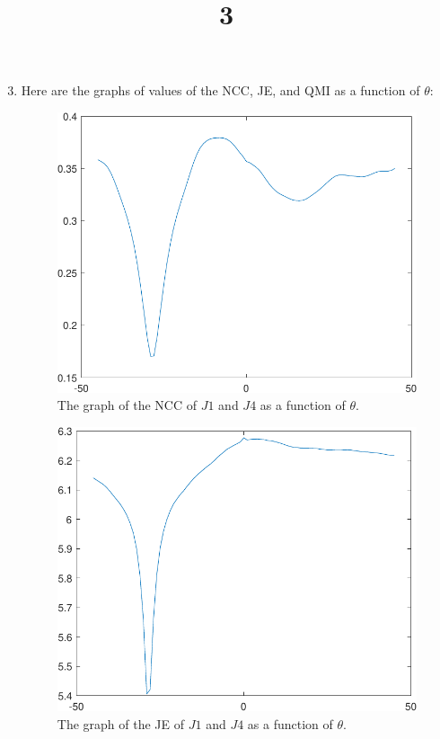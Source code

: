 \documentclass[a4paper]{article}
\title{3}
\date{}
\begin{document}
\maketitle

\begin{enumerate}[label=(\alph*)]
\setcounter{enumi}{2}
\item Here are the graphs of values of the NCC, JE, and QMI as a function of $\theta$:
\begin{figure}[H]
\centering
\includegraphics[scale=0.95]{ncc.pdf}
\caption{The graph of the NCC of $J1$ and $J4$ as a function of $\theta$.}
\end{figure}

\begin{figure}[H]
\centering
\includegraphics[scale=0.95]{je.pdf}
\caption{The graph of the JE of $J1$ and $J4$ as a function of $\theta$.}
\end{figure}


\end{enumerate}
\end{document}
